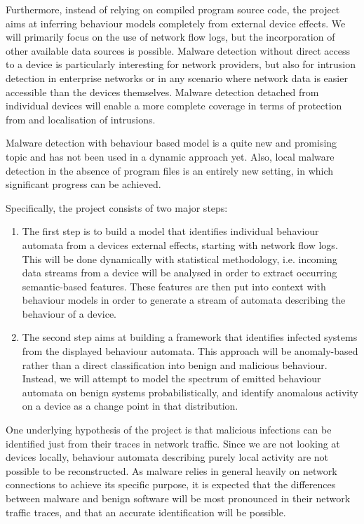\documentclass[11pt]{article}
\begin{document}
Furthermore, instead of relying on compiled program source code, the project aims at inferring behaviour models completely from external device effects. We will primarily focus on the use of network flow logs, but the incorporation of other available data sources is possible. Malware detection without direct access to a device is particularly interesting for network providers, but also for intrusion detection in enterprise networks or in any scenario where network data is easier accessible than the devices themselves. Malware detection detached from individual devices will enable a more complete coverage in terms of protection from and localisation of intrusions.

Malware detection with behaviour based model is a quite new and promising topic and has not been used in a dynamic approach yet. Also, local malware detection in the absence of program files is an entirely new setting, in which significant progress can be achieved. 

\vspace{0.4cm}

Specifically, the project consists of two major steps:

\begin{enumerate}

\item  The first step is to build a model that identifies individual behaviour automata from a devices external effects, starting with network flow logs. This will be done dynamically with statistical methodology, i.e. incoming data streams from a device will be analysed in order to extract occurring semantic-based features. These features are then put into context with behaviour models in order to generate a stream of automata describing the behaviour of a device.

\item The second step aims at building a framework that identifies infected systems from the displayed behaviour automata. This approach will be anomaly-based rather than a direct classification into benign and malicious behaviour. Instead, we will attempt to model the spectrum of emitted behaviour automata on benign systems probabilistically, and identify anomalous activity on a device as a change point in that distribution.

\end{enumerate}

One underlying hypothesis of the project is that malicious infections can be identified just from their traces in network traffic. Since we are not looking at devices locally, behaviour automata describing purely local activity are not possible to be reconstructed. As malware relies in general heavily on network connections to achieve its specific purpose, it is expected that the differences between malware and benign software will be most pronounced in their network traffic traces, and that an accurate identification will be possible.
\end{document}
